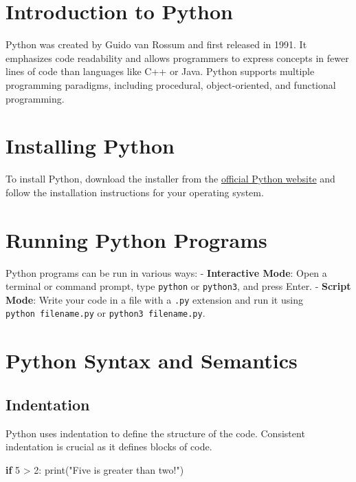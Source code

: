 \documentclass[
  letterpaper,
  DIV=11,
  numbers=noendperiod]{scrreprt}
\newenvironment{Shaded}{\begin{snugshade}}{\end{snugshade}}
\newcommand{\BuiltInTok}[1]{\textcolor[rgb]{0.00,0.23,0.31}{#1}}
\newcommand{\ControlFlowTok}[1]{\textcolor[rgb]{0.00,0.23,0.31}{\textbf{#1}}}
\newcommand{\DecValTok}[1]{\textcolor[rgb]{0.68,0.00,0.00}{#1}}
\newcommand{\NormalTok}[1]{\textcolor[rgb]{0.00,0.23,0.31}{#1}}
\newcommand{\OperatorTok}[1]{\textcolor[rgb]{0.37,0.37,0.37}{#1}}
\newcommand{\StringTok}[1]{\textcolor[rgb]{0.13,0.47,0.30}{#1}}
\begin{document}
\section{Introduction to Python}\label{introduction-to-python}

Python was created by Guido van Rossum and first released in 1991. It
emphasizes code readability and allows programmers to express concepts
in fewer lines of code than languages like C++ or Java. Python supports
multiple programming paradigms, including procedural, object-oriented,
and functional programming.

\section{Installing Python}\label{installing-python-1}

To install Python, download the installer from the
\href{https://www.python.org/downloads/}{official Python website} and
follow the installation instructions for your operating system.

\section{Running Python Programs}\label{running-python-programs}

Python programs can be run in various ways: - \textbf{Interactive Mode}:
Open a terminal or command prompt, type \texttt{python} or
\texttt{python3}, and press Enter. - \textbf{Script Mode}: Write your
code in a file with a \texttt{.py} extension and run it using
\texttt{python\ filename.py} or \texttt{python3\ filename.py}.

\section{Python Syntax and Semantics}\label{python-syntax-and-semantics}

\subsection{Indentation}\label{indentation}

Python uses indentation to define the structure of the code. Consistent
indentation is crucial as it defines blocks of code.

\begin{Shaded}
\begin{Highlighting}[]
\ControlFlowTok{if} \DecValTok{5} \OperatorTok{\textgreater{}} \DecValTok{2}\NormalTok{:}
    \BuiltInTok{print}\NormalTok{(}\StringTok{"Five is greater than two!"}\NormalTok{)}
\end{Highlighting}
\end{Shaded}
\end{document}
